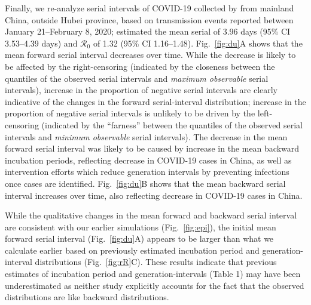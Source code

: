 \documentclass[12pt]{article}
\newcommand{\fref}[1]{Fig.~\ref{fig:#1}}
\newcommand{\Rx}[1]{\ensuremath{{\mathcal R}_{#1}}\xspace}
\newcommand{\Ro}{\Rx{0}}
\providecommand{\DIFaddtex}[1]{{\protect\color{blue}\uwave{#1}}} %
\providecommand{\DIFaddbegin}{} %
\providecommand{\DIFaddend}{} %
\providecommand{\DIFdelend}{} %
\providecommand{\DIFadd}[1]{\texorpdfstring{\DIFaddtex{#1}}{#1}} %
\newcommand{\DIFaddincludegraphics}[2][]{{\color{blue}\fbox{\DIFOincludegraphics[#1]{#2}}}} %
\DeclareRobustCommand{\DIFaddbegin}{\DIFOaddbegin \let\includegraphics\DIFaddincludegraphics} %
\DeclareRobustCommand{\DIFaddend}{\DIFOaddend \let\includegraphics\DIFOincludegraphics} %
\DeclareRobustCommand{\DIFdelend}{\DIFOaddend \let\includegraphics\DIFOincludegraphics} %
\begin{document}
\DIFdelend Finally, we re-analyze serial intervals of COVID-19 collected by \cite{du2020serial} from mainland China, outside Hubei province, based on transmission events reported between January 21--February 8, 2020;
\cite{du2020serial} estimated the mean serial \DIFaddbegin \DIFadd{interval }\DIFaddend of 3.96 days (95\% CI 3.53–4.39 days) and \Ro of 1.32 (95\% CI 1.16–1.48).
\fref{du}A shows that the mean forward serial interval decreases over time.
While the decrease is likely to be affected by the right-censoring (indicated by the closeness between the quantiles of the observed serial intervals and \emph{maximum observable} serial intervals), increase in the proportion of negative serial intervals are clearly indicative of the changes in the forward serial-interval distribution;
increase in the proportion of negative serial intervals is unlikely to be driven by the left-censoring (indicated by the ``farness'' between the quantiles of the observed serial intervals and \emph{minimum observable} serial intervals).
The decrease in the mean forward serial interval was likely to be caused by increase in the mean backward incubation periods, reflecting decrease in COVID-19 cases in China, as well as intervention efforts which reduce generation intervals by preventing infections once cases are identified.
\fref{du}B shows that the mean backward serial interval increases over time, also reflecting decrease in COVID-19 cases in China.

While the qualitative changes in the mean forward and backward serial interval are consistent with our earlier simulations (\fref{epi}), the initial mean forward serial interval (\fref{du}A) appears to be larger than what we calculate earlier based on previously estimated incubation period and generation-interval distributions (\fref{rR}C).
These results indicate that previous estimates of incubation period and generation-intervals (Table 1) may have been underestimated as neither study explicitly accounts for the fact that the observed distributions are like backward distributions.
\end{document}
